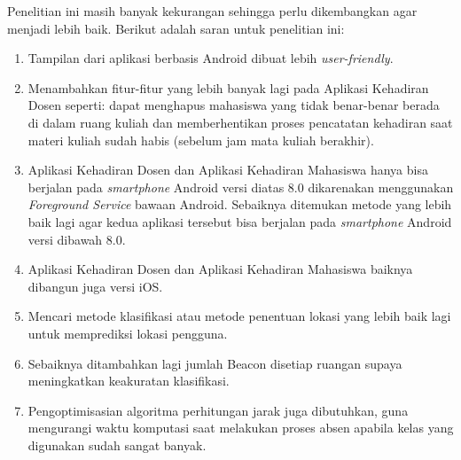 Penelitian ini masih banyak kekurangan sehingga perlu dikembangkan agar menjadi lebih baik. Berikut adalah saran untuk penelitian ini:
\begin{enumerate}
	\item Tampilan dari aplikasi berbasis Android dibuat lebih \textit{user-friendly}.
	\item Menambahkan fitur-fitur yang lebih banyak lagi pada Aplikasi Kehadiran Dosen seperti: dapat menghapus mahasiswa yang tidak benar-benar berada di dalam ruang kuliah dan memberhentikan proses pencatatan kehadiran saat materi kuliah sudah habis (sebelum jam mata kuliah berakhir).
	\item Aplikasi Kehadiran Dosen dan Aplikasi Kehadiran Mahasiswa hanya bisa berjalan pada \textit{smartphone} Android versi diatas 8.0 dikarenakan menggunakan \textit{Foreground Service} bawaan Android. Sebaiknya ditemukan metode yang lebih baik lagi agar kedua aplikasi tersebut bisa berjalan pada \textit{smartphone} Android versi dibawah 8.0.
	\item Aplikasi Kehadiran Dosen dan Aplikasi Kehadiran Mahasiswa baiknya dibangun juga  versi iOS.
	\item Mencari metode klasifikasi atau metode penentuan lokasi yang lebih baik lagi untuk memprediksi lokasi pengguna.
	\item Sebaiknya ditambahkan lagi jumlah Beacon disetiap ruangan supaya meningkatkan keakuratan klasifikasi.
	\item Pengoptimisasian algoritma perhitungan jarak juga dibutuhkan, guna mengurangi waktu komputasi saat melakukan proses absen apabila kelas yang digunakan sudah sangat banyak.
\end{enumerate}

\fancyhf{}
\fancyfoot[R]{\thepage}

\begin{comment}

\end{comment}
